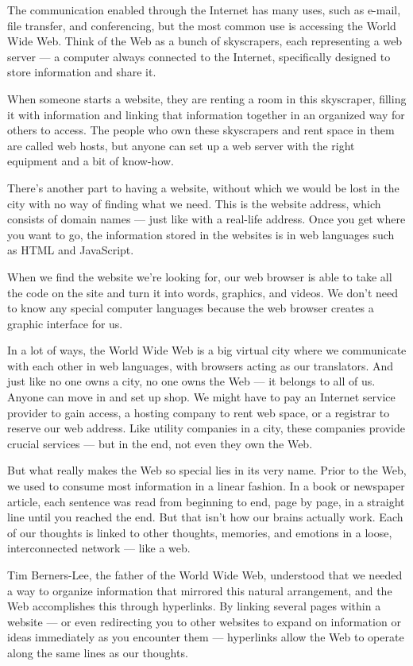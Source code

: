 The communication enabled through the Internet has many uses, such as e-mail, file transfer, and conferencing, but the most common use is accessing the World Wide Web. Think of the Web as a bunch of skyscrapers, each representing a web server — a computer always connected to the Internet, specifically designed to store information and share it.

When someone starts a website, they are renting a room in this skyscraper, filling it with information and linking that information together in an organized way for others to access. The people who own these skyscrapers and rent space in them are called web hosts, but anyone can set up a web server with the right equipment and a bit of know-how.

There's another part to having a website, without which we would be lost in the city with no way of finding what we need. This is the website address, which consists of domain names — just like with a real-life address. Once you get where you want to go, the information stored in the websites is in web languages such as HTML and JavaScript.

When we find the website we're looking for, our web browser is able to take all the code on the site and turn it into words, graphics, and videos. We don't need to know any special computer languages because the web browser creates a graphic interface for us.

In a lot of ways, the World Wide Web is a big virtual city where we communicate with each other in web languages, with browsers acting as our translators. And just like no one owns a city, no one owns the Web — it belongs to all of us. Anyone can move in and set up shop. We might have to pay an Internet service provider to gain access, a hosting company to rent web space, or a registrar to reserve our web address. Like utility companies in a city, these companies provide crucial services — but in the end, not even they own the Web.

But what really makes the Web so special lies in its very name. Prior to the Web, we used to consume most information in a linear fashion. In a book or newspaper article, each sentence was read from beginning to end, page by page, in a straight line until you reached the end. But that isn't how our brains actually work. Each of our thoughts is linked to other thoughts, memories, and emotions in a loose, interconnected network — like a web.

Tim Berners-Lee, the father of the World Wide Web, understood that we needed a way to organize information that mirrored this natural arrangement, and the Web accomplishes this through hyperlinks. By linking several pages within a website — or even redirecting you to other websites to expand on information or ideas immediately as you encounter them — hyperlinks allow the Web to operate along the same lines as our thoughts.

